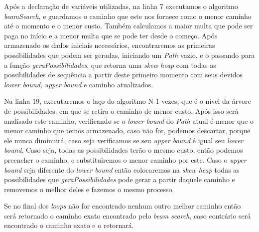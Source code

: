 \documentclass[
	11pt,				%
	oneside,			%
	a4paper,			%
	english,			%
	brazil,				%
	]{article}
\begin{document}
Após a declaração de variáveis utilizadas, na linha 7 executamos o algoritmo \textit{beamSearch}, e guardamos o caminho que este nos fornece como o menor caminho até o momento e o menor custo. Também calculamos a maior multa que pode ser paga no início e a menor multa que se pode ter desde o começo. Após armazenado os dados iniciais necessários, encontraremos as primeiras possibilidades que podem ser geradas, iniciando um \textit{Path} vazio, e o passando para a função \textit{geraPossibilidades}, que retorna uma \textit{skew heap} com todas as possibilidades de sequência a partir deste primeiro momento com seus devidos \textit{lower bound}, \textit{upper bound} e caminho atualizados.

Na linha 19, executaremos o laço do algoritmo N-1 vezes, que é o nível da árvore de possibilidades, em que se retira o caminho de menor custo. Após isso será analisado este caminho, verificando se o \textit{lower bound} do \textit{Path} atual é menor que o menor caminho que temos armazenado, caso não for, podemos descartar, porque ele nunca diminuirá, caso seja verificamos se seu \textit{upper bound} é igual seu \textit{lower bound}. Caso seja, todas as possibilidades terão o mesmo custo, então podemos preencher o caminho, e substituiremos o menor caminho por este. Caso o \textit{upper bound} seja diferente do \textit{lower bound} então colocaremos na \textit{skew heap} todas as possibilidades que \textit{geraPossibilidades} pode gerar a partir daquele caminho e removemos o melhor deles e fazemos o mesmo processo.

Se no final dos \textit{loops} não for encontrado nenhum outro melhor caminho então será retornado o caminho exato encontrado pelo \textit{beam search}, caso contrário será encontrado o caminho exato e o retornará.
\end{document}

